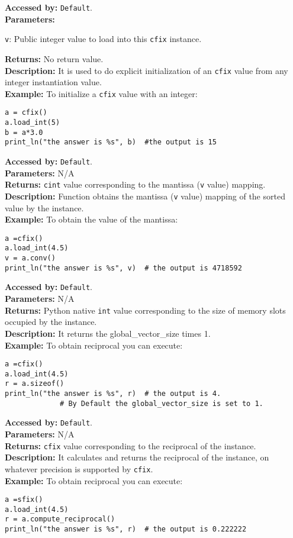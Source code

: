 			\textbf{Accessed by:} \verb|Default|.		 \\
			\textbf{Parameters:}
			\begin{description}
				\item \verb|v|: Public integer value to load into this \verb|cfix| instance.
			\end{description}
			\textbf{Returns:} No return value. \\
			\textbf{Description:}
				 It is used to do explicit initialization of an \verb|cfix| value from any integer instantiation value. \\
	     	\textbf{Example:}
    		    To initialize a \verb|cfix| value with an integer:
\begin{lstlisting}
a = cfix()
a.load_int(5)
b = a*3.0
print_ln("the answer is %s", b)  #the output is 15   	
\end{lstlisting}	 
			\textbf{Accessed by:} \verb|Default|.		 \\
			\textbf{Parameters:} N/A \\
			\textbf{Returns:} \verb|cint| value corresponding to the mantissa (\verb|v| value) mapping. \\
			\textbf{Description:}
				Function obtains the mantissa (\verb|v| value) mapping of the sorted value by the instance. \\
	     	\textbf{Example:}
    		    To obtain the value of the mantissa:
\begin{lstlisting}
a =cfix()
a.load_int(4.5)
v = a.conv()
print_ln("the answer is %s", v)  # the output is 4718592   	
\end{lstlisting}	 
		
		
			\textbf{Accessed by:} \verb|Default|.		 \\
			\textbf{Parameters:} N/A \\
			\textbf{Returns:}
				 Python native \verb|int| value corresponding to the size of memory slots occupied by the instance. \\
			\textbf{Description:}
				It returns the global_vector_size times 1. \\
	     	\textbf{Example:}
    		    To obtain reciprocal you can execute:
\begin{lstlisting}
a =cfix()
a.load_int(4.5)
r = a.sizeof()
print_ln("the answer is %s", r)  # the output is 4. 
			 # By Default the global_vector_size is set to 1.    	
\end{lstlisting}	 
			\textbf{Accessed by:} \verb|Default|.		 \\
			\textbf{Parameters:} N/A \\
			\textbf{Returns:} \verb|cfix| value corresponding to the reciprocal of the instance. \\
			\textbf{Description:}
				It calculates and returns the reciprocal of the instance, on whatever precision is supported by \verb|cfix|.\\
	     	\textbf{Example:}
    		    To obtain reciprocal you can execute:
\begin{lstlisting}
a =sfix()
a.load_int(4.5)
r = a.compute_reciprocal()
print_ln("the answer is %s", r)  # the output is 0.222222   	
\end{lstlisting}	 
